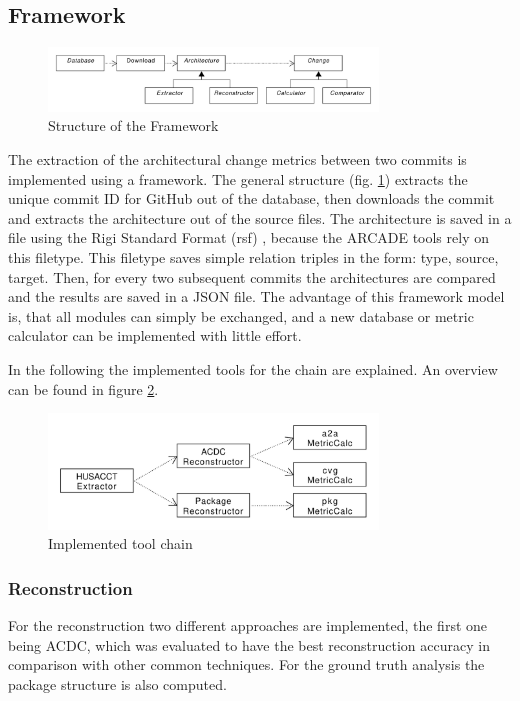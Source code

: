\documentclass[conference]{IEEEtran}
\begin{document}
\subsection{Framework}

\begin{figure}
	\centering
	\includegraphics[width=3.45in]{assets/architecture.pdf}
	\caption{Structure of the Framework}
	\label{frameworkStructure}
\end{figure}

The extraction of the architectural change metrics between two commits is implemented using a framework. The general structure (fig. \ref{frameworkStructure}) extracts the unique commit ID for GitHub out of the database, then downloads the commit and extracts the architecture out of the source files. The architecture is saved in a file using the Rigi Standard Format (rsf) \cite{RSF}, because the ARCADE tools rely on this filetype. This filetype saves simple relation triples in the form: type, source, target. Then, for every two subsequent commits the architectures are compared and the results are saved in a JSON file. The advantage of this framework model is, that all modules can simply be exchanged, and a new database or metric calculator can be implemented with little effort.

In the following the implemented tools for the chain are explained. An overview can be found in figure \ref{implToolchain}.

\begin{figure}
	\centering
	\includegraphics[width=3.45in]{assets/implementedArc.pdf}
	\caption{Implemented tool chain}
	\label{implToolchain}
\end{figure}


\subsubsection{Reconstruction}

For the reconstruction two different approaches are implemented, the first one being ACDC, which was evaluated to have the best reconstruction accuracy \cite{arcRec-comparison} in comparison with other common techniques. For the ground truth analysis the package structure is also computed. 
\end{document}
